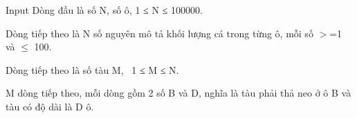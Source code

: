 Input
Dòng đầu là số N, số ô, 1 ≤ N ≤ 100000.

Dòng tiếp theo là N số nguyên mô tả khối lượng cá trong từng ô, mỗi số $>$=1 và  $\le$ 100.

Dòng tiếp theo là số tàu M,  1 ≤ M ≤ N.

M dòng tiếp theo, mỗi dòng gồm 2 số B và D, nghĩa là tàu phải thả neo ở ô B và tàu có độ dài là D ô.